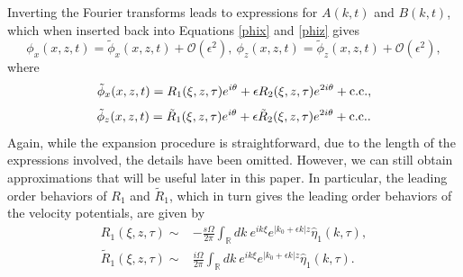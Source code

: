 \documentclass{JFM_Style/jfm}
\begin{document}
Inverting the Fourier transforms leads to expressions for $A(k,t)$ and $B(k,t)$, which when inserted back into Equations \eqref{phix} and \eqref{phiz} gives 
\[
\phi_{x}(x,z,t) = \tilde{\phi}_{x}(x,z,t) + \mathcal{O}(\epsilon^{2}), ~ \phi_{z}(x,z,t) = \tilde{\phi}_{z}(x,z,t) + \mathcal{O}(\epsilon^{2}),
\]
where 
\begin{equation}
\tilde{\phi}_{x}(x,z,t) = R_{1}(\xi,z,\tau)e^{i\theta} \\+ \epsilon R_{2}(\xi,z,\tau)e^{2i\theta} + \mbox{c.c.},
\label{phixexp}
\end{equation}
\begin{equation}
\tilde{\phi}_{z}(x,z,t) =  \tilde{R}_{1}(\xi,z,\tau)e^{i\theta} \\+ \epsilon \tilde{R}_{2}(\xi,z,\tau)e^{2i\theta} + \mbox{c.c.}.
\label{phizexp}
\end{equation}
Again, while the expansion procedure is straightforward, due to the length of the expressions involved, the details have been omitted.  However, we can still obtain approximations that will be useful later in this paper.  In particular, the leading order behaviors of $R_{1}$ and $\tilde{R}_{1}$, which in turn gives the leading order behaviors of the velocity potentials, are given by 
\begin{align}
R_{1}(\xi,z,\tau) \sim & -\frac{s\Omega}{2\pi}\int_{\mathbb{R}} dk ~ e^{i k \xi} e^{|k_{0}+\epsilon k|z}\hat{\eta}_{1}(k,\tau), \label{roeqx}\\
\tilde{R}_{1}(\xi,z,\tau) \sim & \frac{i\Omega}{2\pi}\int_{\mathbb{R}} dk ~ e^{i k \xi} e^{|k_{0}+\epsilon k|z}\hat{\eta}_{1}(k,\tau). 
\label{roeqz}
\end{align}

\end{document}
